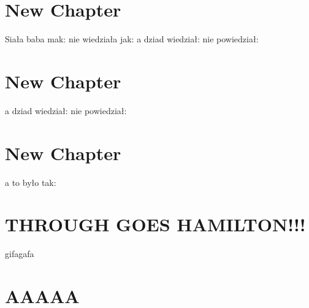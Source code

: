 \documentclass{article}
\begin{document}
\section{New Chapter}
Siała baba mak: nie wiedziała jak: a dziad wiedział: nie powiedział:
\section{New Chapter}
a dziad wiedział: nie powiedział:
\section{New Chapter}
a to było tak:



\section{THROUGH GOES HAMILTON!!!}
gifagafa
\section{AAAAA}
\end{document}
